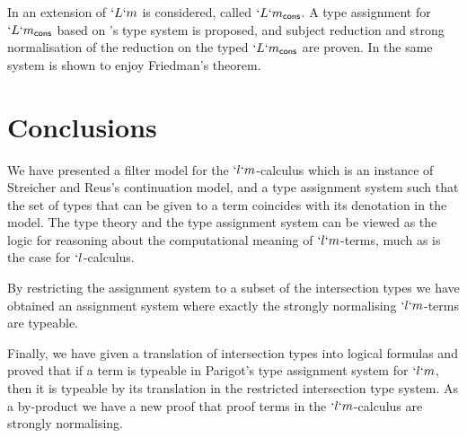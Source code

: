 \documentclass{lmcs}
\begin{document}
In \cite{NakazawaN14} an extension of $`L`m$ is considered, called $`L`m_{\sf cons}$. 
A type assignment for $`L`m_{\sf cons}$ based on \cite{deLiguoro:ApproxLM12}'s type system is proposed, and subject reduction and strong normalisation of the reduction on the typed $`L`m_{\sf cons}$ are proven. 
In \cite{Nakazawa-ITRS14} the same system is shown to enjoy Friedman's theorem.


 \section*{Conclusions} \label{conclusions}
We have presented a filter model for the $`l`m$-calculus which is an instance of Streicher and Reus's continuation model, and a type assignment system such that the set of types that can be given to a term coincides with its denotation in the model. 
The type theory and the type assignment system can be viewed as the logic for reasoning about the computational meaning of $`l`m$-terms, much as is the case for $`l$-calculus. 

By restricting the assignment system to a subset of the intersection types we have obtained an assignment system where exactly the strongly normalising $`l`m$-terms are typeable. 

Finally, we have given a translation of intersection types into logical formulas and proved that if a term is typeable in Parigot's type assignment system for $`l`m$, then it is typeable by its translation in the restricted intersection type system. 
As a by-product we have a new proof that proof terms in the $`l`m$-calculus are strongly normalising.


%  
\end{document}
